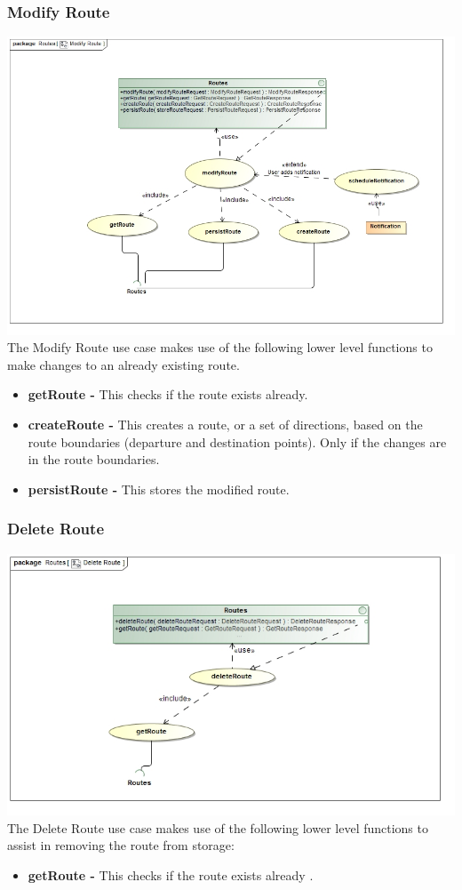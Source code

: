\documentclass[a4paper,12pt]{article}
\begin{document}
\subsubsection{Modify Route} 
\includegraphics[width=\textwidth]{images/Modify_Route.jpg}
The Modify Route use case makes use of the following lower level functions to make changes to an already existing route.
\begin{itemize}
\item \textbf{getRoute -} This checks if the route exists already.
\item \textbf{createRoute -} This creates a route, or a set of directions, based on the route boundaries (departure and destination points). Only if the changes are in the route boundaries.
\item \textbf{persistRoute -} This stores the modified route.
\end{itemize}

\subsubsection{Delete Route}
\includegraphics[width=\textwidth]{images/Delete_Route.jpg}
The Delete Route use case makes use of the following lower level functions to assist in removing the route from storage:
\begin{itemize}
\item \textbf{getRoute -} This checks if the route exists already .
\end{itemize}
\end{document}
